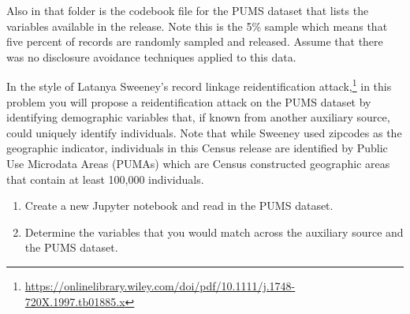 \documentclass[11pt]{article}
\begin{document}
\begin{enumerate}[leftmargin=*]
Also in that folder is the codebook file for the PUMS dataset that lists the variables available in the release.  Note this is the 5\% sample which means that five percent of records are randomly sampled and released.
Assume that there was no disclosure avoidance techniques applied to this data.

In the style of Latanya Sweeney's record linkage reidentification attack,\footnote{\url{https://onlinelibrary.wiley.com/doi/pdf/10.1111/j.1748-720X.1997.tb01885.x}} in this problem you will propose a reidentification attack on the PUMS dataset by identifying demographic variables that, if known from another auxiliary source, could uniquely identify individuals.  Note that while Sweeney used zipcodes as the geographic indicator, individuals in this Census release are identified by Public Use Microdata Areas (PUMAs) which are Census constructed geographic areas that contain at least 100,000 individuals. 

\begin{enumerate}
    \item Create a new Jupyter notebook and read in the PUMS dataset.
    \item Determine the variables that you would match across the auxiliary source and the PUMS dataset. 
 

\end{enumerate}
\end{enumerate}
\end{document}
